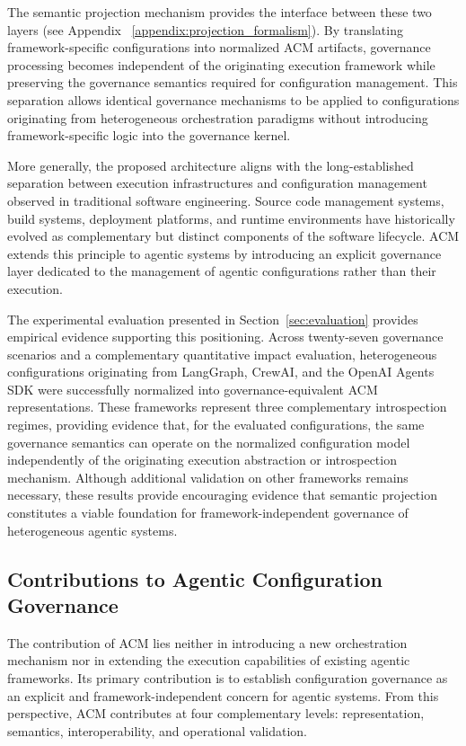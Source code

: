 \documentclass[10pt]{article}
\begin{document}
The semantic projection mechanism provides the interface between these two layers (see Appendix ~\ref{appendix:projection_formalism}). By translating framework-specific configurations into normalized ACM artifacts, governance processing becomes independent of the originating execution framework while preserving the governance semantics required for configuration management. This separation allows identical governance mechanisms to be applied to configurations originating from heterogeneous orchestration paradigms without introducing framework-specific logic into the governance kernel.

More generally, the proposed architecture aligns with the long-established separation between execution infrastructures and configuration management observed in traditional software engineering. Source code management systems, build systems, deployment platforms, and runtime environments have historically evolved as complementary but distinct components of the software lifecycle. ACM extends this principle to agentic systems by introducing an explicit governance layer dedicated to the management of agentic configurations rather than their execution.

The experimental evaluation presented in Section~\ref{sec:evaluation} provides empirical evidence supporting this positioning. Across twenty-seven governance scenarios and a complementary quantitative impact evaluation, heterogeneous configurations originating from LangGraph, CrewAI, and the OpenAI Agents SDK were successfully normalized into governance-equivalent ACM representations. These frameworks represent three complementary introspection regimes, providing evidence that, for the evaluated configurations, the same governance semantics can operate on the normalized configuration model independently of the originating execution abstraction or introspection mechanism. Although additional validation on other frameworks remains necessary, these results provide encouraging evidence that semantic projection constitutes a viable foundation for framework-independent governance of heterogeneous agentic systems.

\subsection{Contributions to Agentic Configuration Governance}
\label{sec:governance_contributions}

The contribution of ACM lies neither in introducing a new orchestration mechanism nor in extending the execution capabilities of existing agentic frameworks. Its primary contribution is to establish configuration governance as an explicit and framework-independent concern for agentic systems. From this perspective, ACM contributes at four complementary levels: representation, semantics, interoperability, and operational validation.
\end{document}
